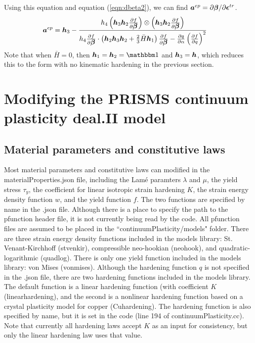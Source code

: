 \documentclass[10pt]{article}
\begin{document}
Using this equation and equation (\ref{eqn:dbeta2}), we can find $\mbox{\boldmath$ a$}^{ep} = \partial \mbox{\boldmath$\beta$}/\partial \mbox{\boldmath$\epsilon$}^{tr}$.
\begin{equation}
\begin{aligned}
\mbox{\boldmath$ a$}^{ep}
&= 
\mbox{\boldmath$ h$}_3
- 
\frac{h_4
\left(\mbox{\boldmath$ h$}_3\mbox{\boldmath$ h$}_2\frac{\partial f}{\partial\mbox{\boldmath$\beta$}}\right)\otimes
\left(\mbox{\boldmath$ h$}_3\mbox{\boldmath$ h$}_2\frac{\partial f}{\partial \mbox{\boldmath$\beta$}}\right)}
{h_4
\frac{\partial f}{\partial \mbox{\boldmath$\beta$}}\cdot
\left(
\mbox{\boldmath$ h$}_2\mbox{\boldmath$ h$}_3\mbox{\boldmath$ h$}_2
 +
\frac{2}{3}\bar{H}\mbox{\boldmath$ h$}_1
\right)
\frac{\partial f}{\partial\mbox{\boldmath$\beta$}}
 - 
{\frac{\partial q}{\partial \alpha}
\left(\frac{\partial f}{\partial q}\right)^2}}
\end{aligned}
\end{equation}
Note that when $\bar{H} = 0$, then $\bh_1 = \bh_2 = \iso$ and $\mbox{\boldmath$ h$}_3 = \mbox{\boldmath$ h$}$, which reduces this to the form with no kinematic hardening in the previous section.


\pagebreak

\section{Modifying the PRISMS continuum plasticity deal.II model}

\subsection{Material parameters and constitutive laws}
Most material parameters and constitutive laws can modified in the materialProperties.json file, including the Lam\'e paramters $\lambda$ and $\mu$, the yield stress $\tau_y$, the coefficient for linear isotropic strain hardening $K$, the strain energy density function $w$, and the yield function $f$. The two functions are specified by name in the .json file. Although there is a place to specify the path to the pfunction header file, it is not currently being read by the code. All pfunction files are assumed to be placed in the ``continuumPlasticity/models" folder. There are three strain energy density functions included in the models library: St. Venant-Kirchhoff (stvenkir), compressible neo-hookian (neohook), and quadratic-logarithmic (quadlog). There is only one yield function included in the models library: von Mises (von\textunderscore mises). Although the hardening function $q$ is not specified in the .json file, there are two hardening functions included in the models library. The default function is a linear hardening function (with coefficient $K$ (linear\textunderscore hardening), and the second is a nonlinear hardening function based on a crystal plasticity model for copper (Cu\textunderscore hardening). The hardening function is also specified by name, but it is set in the code (line 194 of continuumPlasticity.cc). Note that currently all hardening laws accept $K$ as an input for consistency, but only the linear hardening law uses that value.
\end{document}
